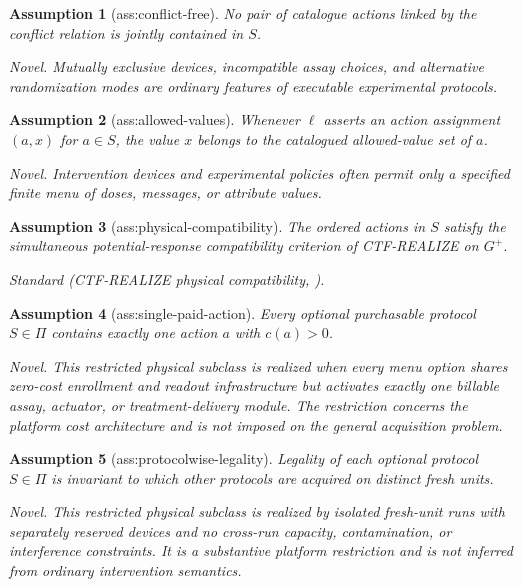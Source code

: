 \documentclass{article}
\newtheorem{assumption}{Assumption}
\begin{document}
\begin{assumption}[ass:conflict-free]\label{ass:conflict-free}
No pair of catalogue actions linked by the conflict relation is jointly contained in \(S\).
\par\smallskip\noindent\emph{Novel.} Mutually exclusive devices, incompatible assay choices, and alternative randomization modes are ordinary features of executable experimental protocols.
\end{assumption}

\begin{assumption}[ass:allowed-values]\label{ass:allowed-values}
Whenever \(\ell\) asserts an action assignment \((a,x)\) for \(a\in S\), the value \(x\) belongs to the catalogued allowed-value set of \(a\).
\par\smallskip\noindent\emph{Novel.} Intervention devices and experimental policies often permit only a specified finite menu of doses, messages, or attribute values.
\end{assumption}

\begin{assumption}[ass:physical-compatibility]\label{ass:physical-compatibility}
The ordered actions in \(S\) satisfy the simultaneous potential-response compatibility criterion of CTF-REALIZE on \(G^{+}\).
\par\smallskip\noindent\emph{Standard} (CTF-REALIZE physical compatibility, \cite{RaghavanBareinboim2025Realizability}).
\end{assumption}

\begin{assumption}[ass:single-paid-action]\label{ass:single-paid-action}
Every optional purchasable protocol \(S\in\Pi\) contains exactly one action \(a\) with \(c(a)>0\).
\par\smallskip\noindent\emph{Novel.} This restricted physical subclass is realized when every menu option shares zero-cost enrollment and readout infrastructure but activates exactly one billable assay, actuator, or treatment-delivery module. The restriction concerns the platform cost architecture and is not imposed on the general acquisition problem.
\end{assumption}

\begin{assumption}[ass:protocolwise-legality]\label{ass:protocolwise-legality}
Legality of each optional protocol \(S\in\Pi\) is invariant to which other protocols are acquired on distinct fresh units.
\par\smallskip\noindent\emph{Novel.} This restricted physical subclass is realized by isolated fresh-unit runs with separately reserved devices and no cross-run capacity, contamination, or interference constraints. It is a substantive platform restriction and is not inferred from ordinary intervention semantics.
\end{assumption}
\end{document}
